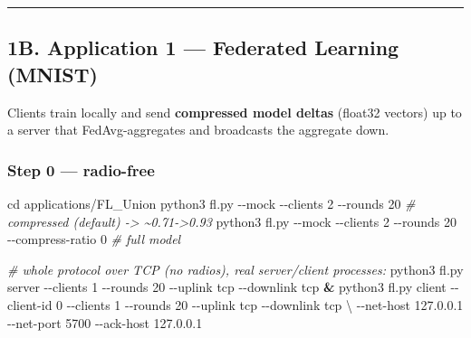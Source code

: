 \documentclass[
  9.5pt,
]{article}
\newenvironment{Shaded}{\begin{snugshade}}{\end{snugshade}}
\newcommand{\AttributeTok}[1]{\textcolor[rgb]{0.77,0.63,0.00}{#1}}
\newcommand{\BuiltInTok}[1]{#1}
\newcommand{\CommentTok}[1]{\textcolor[rgb]{0.56,0.35,0.01}{\textit{#1}}}
\newcommand{\DataTypeTok}[1]{\textcolor[rgb]{0.13,0.29,0.53}{#1}}
\newcommand{\ExtensionTok}[1]{#1}
\newcommand{\KeywordTok}[1]{\textcolor[rgb]{0.13,0.29,0.53}{\textbf{#1}}}
\newcommand{\NormalTok}[1]{#1}
\begin{document}
\begin{center}\rule{0.5\linewidth}{0.5pt}\end{center}

\hypertarget{1b-application-1--federated-learning-mnist}{%
\subsection{1B. Application 1 --- Federated Learning
(MNIST)}\label{1b-application-1--federated-learning-mnist}}

Clients train locally and send \textbf{compressed model deltas} (float32
vectors) up to a server that FedAvg-aggregates and broadcasts the
aggregate down.

\hypertarget{step-0--radio-free}{%
\subsubsection{Step 0 --- radio-free}\label{step-0--radio-free}}

\begin{Shaded}
\begin{Highlighting}[]
\BuiltInTok{cd}\NormalTok{ applications/FL\_Union}
\ExtensionTok{python3}\NormalTok{ fl.py }\AttributeTok{{-}{-}mock} \AttributeTok{{-}{-}clients}\NormalTok{ 2 }\AttributeTok{{-}{-}rounds}\NormalTok{ 20                    }\CommentTok{\# compressed (default) {-}\textgreater{} \textasciitilde{}0.71{-}\textgreater{}0.93}
\ExtensionTok{python3}\NormalTok{ fl.py }\AttributeTok{{-}{-}mock} \AttributeTok{{-}{-}clients}\NormalTok{ 2 }\AttributeTok{{-}{-}rounds}\NormalTok{ 20 }\AttributeTok{{-}{-}compress{-}ratio}\NormalTok{ 0 }\CommentTok{\# full model}

\CommentTok{\# whole protocol over TCP (no radios), real server/client processes:}
\ExtensionTok{python3}\NormalTok{ fl.py server }\AttributeTok{{-}{-}clients}\NormalTok{ 1 }\AttributeTok{{-}{-}rounds}\NormalTok{ 20 }\AttributeTok{{-}{-}uplink}\NormalTok{ tcp }\AttributeTok{{-}{-}downlink}\NormalTok{ tcp }\KeywordTok{\&}
\ExtensionTok{python3}\NormalTok{ fl.py client }\AttributeTok{{-}{-}client{-}id}\NormalTok{ 0 }\AttributeTok{{-}{-}clients}\NormalTok{ 1 }\AttributeTok{{-}{-}rounds}\NormalTok{ 20 }\AttributeTok{{-}{-}uplink}\NormalTok{ tcp }\AttributeTok{{-}{-}downlink}\NormalTok{ tcp }\DataTypeTok{\textbackslash{}}
        \AttributeTok{{-}{-}net{-}host}\NormalTok{ 127.0.0.1 }\AttributeTok{{-}{-}net{-}port}\NormalTok{ 5700 }\AttributeTok{{-}{-}ack{-}host}\NormalTok{ 127.0.0.1}
\end{Highlighting}
\end{Shaded}
\end{document}
